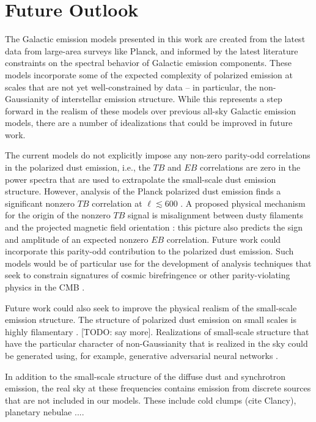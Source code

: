 \documentclass[twocolumn]{aastex631}
\begin{document}
\section{Future Outlook} \label{sec:discussion}

The Galactic emission models presented in this work are created from the latest data from large-area surveys like Planck, and informed by the latest literature constraints on the spectral behavior of Galactic emission components. These models incorporate some of the expected complexity of polarized emission at scales that are not yet well-constrained by data -- in particular, the non-Gaussianity of interstellar emission structure. While this represents a step forward in the realism of these models over previous all-sky Galactic emission models, there are a number of idealizations that could be improved in future work. 

The current models do not explicitly impose any non-zero parity-odd correlations in the polarized dust emission, i.e., the $TB$ and $EB$ correlations are zero in the power spectra that are used to extrapolate the small-scale dust emission structure. However, analysis of the Planck polarized dust emission finds a significant nonzero $TB$ correlation at $\ell \lesssim 600$ \citep{planck2016-l11A, Weiland:2020}. A proposed physical mechanism for the origin of the nonzero $TB$ signal is misalignment between dusty filaments and the projected magnetic field orientation \citep{Huffenberger:2020, Clark:2021, Cukierman:2023}: this picture also predicts the sign and amplitude of an expected nonzero $EB$ correlation. Future work could incorporate this parity-odd contribution to the polarized dust emission. Such models would be of particular use for the development of analysis techniques that seek to constrain signatures of cosmic birefringence or other parity-violating physics in the CMB \citep[e.g.,][]{Minami:2020, Eskilt:2022}.

Future work could also seek to improve the physical realism of the small-scale emission structure. The structure of polarized dust emission on small scales is highly filamentary \citep[e.g.,][]{Clark:2015, Halal:2024}. [TODO: say more]. Realizations of small-scale structure that have the particular character of non-Gaussianity that is realized in the sky could be generated using, for example, generative adversarial neural networks \citep{Krachmalnicoff:2021}.

In addition to the small-scale structure of the diffuse dust and synchrotron emission, the real sky at these frequencies contains emission from discrete sources that are not included in our models. These include cold clumps (cite Clancy), planetary nebulae ....
\end{document}
